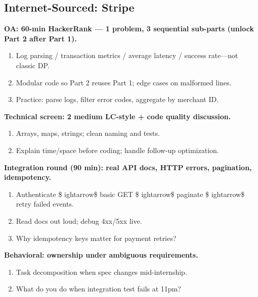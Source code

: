 \documentclass[9pt,a4paper]{article}
\begin{document}
\subsection{Internet-Sourced: Stripe}
\textbf{OA: 60-min HackerRank --- 1 problem, 3 sequential sub-parts (unlock Part 2 after Part 1).}
\begin{enumerate}[label=\textit{Probe \arabic*:}]
  \item Log parsing / transaction metrics / average latency / success rate---not classic DP.
  \item Modular code so Part 2 reuses Part 1; edge cases on malformed lines.
  \item Practice: parse logs, filter error codes, aggregate by merchant ID.
\end{enumerate}
\vspace{2mm}
\textbf{Technical screen: 2 medium LC-style + code quality discussion.}
\begin{enumerate}[label=\textit{Probe \arabic*:}]
  \item Arrays, maps, strings; clean naming and tests.
  \item Explain time/space before coding; handle follow-up optimization.
\end{enumerate}
\vspace{2mm}
\textbf{Integration round (90 min): real API docs, HTTP errors, pagination, idempotency.}
\begin{enumerate}[label=\textit{Probe \arabic*:}]
  \item Authenticate \$
ightarrow\$ basic GET \$
ightarrow\$ paginate \$
ightarrow\$ retry failed events.
  \item Read docs out loud; debug 4xx/5xx live.
  \item Why idempotency keys matter for payment retries?
\end{enumerate}
\vspace{2mm}
\textbf{Behavioral: ownership under ambiguous requirements.}
\begin{enumerate}[label=\textit{Probe \arabic*:}]
  \item Task decomposition when spec changes mid-internship.
  \item What do you do when integration test fails at 11pm?
\end{enumerate}
\vspace{2mm}
\end{document}
